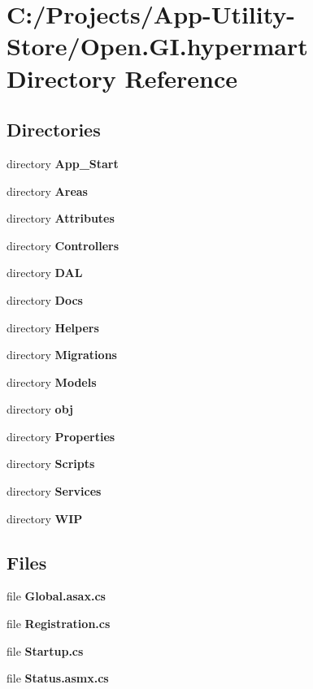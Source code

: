 \section{C\+:/\+Projects/\+App-\/\+Utility-\/\+Store/\+Open.G\+I.\+hypermart Directory Reference}
\label{dir_c5e763eb18a1a3d9017cce7a688d347c}
\subsection*{Directories}
\begin{DoxyCompactItemize}
\item 
directory \textbf{ App\+\_\+\+Start}
\item 
directory \textbf{ Areas}
\item 
directory \textbf{ Attributes}
\item 
directory \textbf{ Controllers}
\item 
directory \textbf{ D\+AL}
\item 
directory \textbf{ Docs}
\item 
directory \textbf{ Helpers}
\item 
directory \textbf{ Migrations}
\item 
directory \textbf{ Models}
\item 
directory \textbf{ obj}
\item 
directory \textbf{ Properties}
\item 
directory \textbf{ Scripts}
\item 
directory \textbf{ Services}
\item 
directory \textbf{ W\+IP}
\end{DoxyCompactItemize}
\subsection*{Files}
\begin{DoxyCompactItemize}
\item 
file \textbf{ Global.\+asax.\+cs}
\item 
file \textbf{ Registration.\+cs}
\item 
file \textbf{ Startup.\+cs}
\item 
file \textbf{ Status.\+asmx.\+cs}
\end{DoxyCompactItemize}
